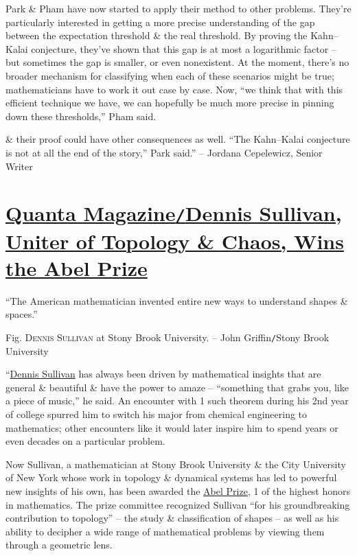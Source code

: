 \documentclass[oneside]{book}
\numberwithin{equation}{section}
\begin{document}
Park \& Pham have now started to apply their method to other problems. They're particularly interested in getting a more precise understanding of the gap between the expectation threshold \& the real threshold. By proving the Kahn--Kalai conjecture, they've shown that this gap is at most a logarithmic factor -- but sometimes the gap is smaller, or even nonexistent. At the moment, there's no broader mechanism for classifying when each of these scenarios might be true; mathematicians have to work it out case by case. Now, ``we think that with this efficient technique we have, we can hopefully be much more precise in pinning down these thresholds,'' Pham said.

\& their proof could have other consequences as well. ``The Kahn--Kalai conjecture is not at all the end of the story,'' Park said.'' -- Jordana Cepelewicz, Senior Writer

\section{\href{https://www.quantamagazine.org/dennis-sullivan-uniter-of-topology-and-chaos-wins-the-abel-prize-20220323/}{Quanta Magazine\texttt{/}Dennis Sullivan, Uniter of Topology \& Chaos, Wins the Abel Prize}}
``The American mathematician invented entire new ways to understand shapes \& spaces.''

\textsf{Fig. \textsc{Dennis Sullivan} at Stony Brook University.} -- John Griffin\texttt{/}Stony Brook University

``\href{https://www.math.stonybrook.edu/~dennis/}{Dennis Sullivan} has always been driven by mathematical insights that are general \& beautiful \& have the power to amaze -- ``something that grabs you, like a piece of music,'' he said. An encounter with 1 such theorem during his 2nd year of college spurred him to switch his major from chemical engineering to mathematics; other encounters like it would later inspire him to spend years or even decades on a particular problem.

Now Sullivan, a mathematician at Stony Brook University \& the City University of New York whose work in topology \& dynamical systems has led to powerful new insights of his own, has been awarded the \href{https://abelprize.no/}{Abel Prize}, 1 of the highest honors in mathematics. The prize committee recognized Sullivan ``for his groundbreaking contribution to topology'' -- the study \& classification of shapes -- as well as his ability to decipher a wide range of mathematical problems by viewing them through a geometric lens.
\end{document}

